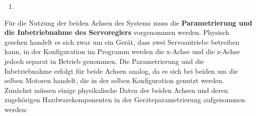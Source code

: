 \documentclass[../../../Bachelorarbeit.tex]{subfiles}
\begin{document}
\begin{itemize}
\begin{enumerate}
\begin{minipage}[t]{\linewidth}
            \label{fig:my-img32}
        \end{minipage}
        \item \begin{minipage}[t]{\linewidth}
            \raggedright
            \label{fig:my-img33}
        \end{minipage}
    \end{enumerate}
\end{itemize}

Für die Nutzung der beiden Achsen des Systems muss die \textbf{Parametrierung und die Inbetriebnahme des Servoreglers} vorgenommen werden. Physisch gesehen handelt es sich zwar um ein Gerät, dass zwei Servoantriebe betreiben kann, in der Konfiguration im Programm werden die x-Achse und die z-Achse jedoch separat in Betrieb genommen. Die Parametrierung und die Inbetriebnahme erfolgt für beide Achsen analog, da es sich bei beiden um die selben Motoren handelt, die in der selben Konfiguration genutzt werden.\\
Zunächst müssen einige physikalische Daten der beiden Achsen und deren zugehörigen Hardwarekomponenten in der Geräteparametrierung aufgenommen werden:
\end{document}
